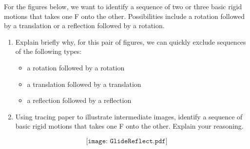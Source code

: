 \newpage
\begin{prob}
For the figures below, we want to identify a sequence of two or three basic rigid motions that takes one F onto the other.  Possibilities include a rotation followed by a translation or a reflection followed by a rotation. 
\begin{enumerate}
\item Explain briefly why, for this pair of figures, we can quickly exclude sequences of the following types: 
\begin{itemize}
\item a rotation followed by a rotation
\item a translation followed by a translation
\item a reflection followed by a reflection
\end{itemize}
\item Using tracing paper to illustrate intermediate images, identify a sequence of basic rigid motions that takes one F onto the other.  Explain your reasoning.  
\end{enumerate}
\vspace{1in}
$$\texttt{[image: GlideReflect.pdf]}$$
\end{prob}

